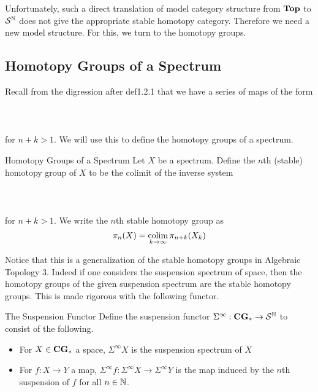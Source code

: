 \documentclass[a4paper]{article}
\begin{document}
Unfortunately, such a direct translation of model category structure from $\bold{Top}$ to $\mathcal{S}^{\mathbb{N}}$ does not give the appropriate stable homotopy category. Therefore we need a new model structure. For this, we turn to the homotopy groups. 

\subsection{Homotopy Groups of a Spectrum}
Recall from the digression after def1.2.1 that we have a series of maps of the form \\~\\
\\~\\
for $n+k>1$. We will use this to define the homotopy groups of a spectrum. 

\begin{defn}{Homotopy Groups of a Spectrum}{} Let $X$ be a spectrum. Define the $n$th (stable) homotopy group of $X$ to be the colimit of the inverse system \\~\\
\\~\\
for $n+k>1$. We write the $n$th stable homotopy group as $$\pi_n(X)=\operatorname*{colim}_{k\to\infty}\pi_{n+k}(X_k)$$
\end{defn}

Notice that this is a generalization of the stable homotopy groups in Algebraic Topology 3. Indeed if one considers the suspension spectrum of space, then the homotopy groups of the given suspension spectrum are the stable homotopy groups. This is made rigorous with the following functor. 

\begin{defn}{The Suspension Functor}{} Define the suspension functor $\Sigma^\infty:\bold{CG}_\ast\to\mathcal{S}^{\mathbb{N}}$ to consist of the following. 
\begin{itemize}
\item For $X\in\bold{CG}_\ast$ a space, $\Sigma^\infty X$ is the suspension spectrum of $X$
\item For $f:X\to Y$ a map, $\Sigma^\infty f:\Sigma^\infty X\to\Sigma^\infty Y$ is the map induced by the $n$th suspension of $f$ for all $n\in\mathbb{N}$. 
\end{itemize}
\end{defn}
\end{document}
